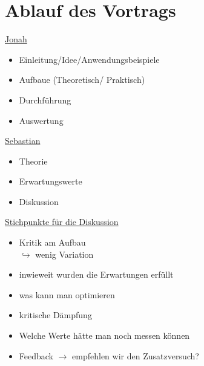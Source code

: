 



\section{Ablauf des Vortrags}

\underline{Jonah}

\begin{itemize}
  \item Einleitung/Idee/Anwendungsbeispiele
  \item Aufbaue (Theoretisch/ Praktisch)
  \item Durchführung
  \item Auswertung
\end{itemize}

\underline{Sebastian}

\begin{itemize}
  \item Theorie
  \item Erwartungswerte
  \item Diskussion
\end{itemize}

\underline{Stichpunkte für die Diskussion}

\begin{itemize}
  \item Kritik am Aufbau \\ $\hookrightarrow$ wenig Variation
  \item inwieweit wurden die Erwartungen erfüllt
  \item was kann man optimieren
  \item kritische Dämpfung
  \item Welche Werte hätte man noch messen können
  \item Feedback $\rightarrow$ empfehlen wir den Zusatzversuch?
\end{itemize}



